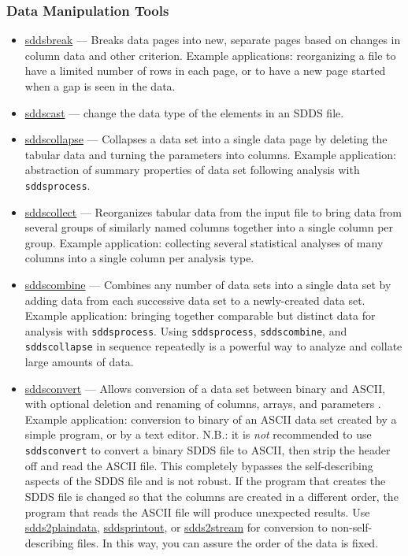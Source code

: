 \documentclass[11pt]{article}
\newcommand{\progref}[1]{\hyperref[#1]{#1}}
\begin{document}
\subsubsection{ Data Manipulation Tools}
\begin{itemize}

\item \progref{sddsbreak} --- Breaks data pages into new, separate pages based on changes in column data and other
criterion.  Example applications: reorganizing a file to have a limited number of rows in each page, or to have a
new page started when a gap is seen in the data.

\item \progref{sddscast} --- change the data type of the elements in an SDDS file.

\item \progref{sddscollapse} --- Collapses a data set into a single data page by deleting the tabular data and
turning the parameters into columns.  Example application: abstraction of summary properties of data set following
analysis with \verb|sddsprocess|.

\item \progref{sddscollect} --- Reorganizes tabular data from the
input file to bring data from several groups of similarly named
columns together into a single column per group.  Example application:
collecting several statistical analyses of many columns into a single
column per analysis type.

\item \progref{sddscombine} --- Combines any number of data sets into a single data set by adding data from each
successive data set to a newly-created data set.  Example application: bringing together comparable but distinct
data for analysis with \verb|sddsprocess|.  Using \verb|sddsprocess|, \verb|sddscombine|, and \verb|sddscollapse|
in sequence repeatedly is a powerful way to analyze and collate large amounts of data.

\item \progref{sddsconvert} --- Allows conversion of a data set between binary and ASCII, with optional deletion
and renaming of columns, arrays, and parameters .  Example application: conversion to binary of an ASCII data set
created by a simple program, or by a text editor.  N.B.: it is {\em not} recommended to use \verb|sddsconvert| to
convert a binary SDDS file to ASCII, then strip the header off and read the ASCII file.  This completely
bypasses the self-describing aspects of the SDDS file and is not robust.  If the program that creates the SDDS
file is changed so that the columns are created in a different order, the program that reads the ASCII file
will produce unexpected results. Use \progref{sdds2plaindata}, \progref{sddsprintout}, or \progref{sdds2stream}
for conversion to non-self-describing files.  In this way, you can assure the order of the data is fixed.


\end{itemize}
\end{document}
